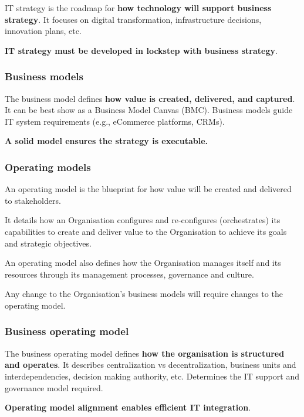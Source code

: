 \indent

IT strategy is the roadmap for \textbf{how technology will support business strategy}. It focuses on digital transformation, infrastructure decisions, innovation plans, etc.

\textbf{IT strategy must be developed in lockstep with business strategy}.

\subsubsection{Business models}

\indent

The business model defines \textbf{how value is created, delivered, and captured}. It can be best show as a Business Model Canvas (BMC). Business models guide IT system requirements (e.g., eCommerce platforms, CRMs).

\textbf{A solid model ensures the strategy is executable.}

\subsubsection{Operating models}

\indent

An operating model is the blueprint for how value will be created and delivered to stakeholders.

It details how an Organisation configures and re-configures (orchestrates) its capabilities to create and deliver value to the Organisation to achieve its goals and strategic objectives.

An operating model also defines how the Organisation manages itself and its resources through its management processes, governance and culture.

Any change to the Organisation’s business models will require changes to the operating model.

\subsubsection{Business operating model}

\indent

The business operating model defines \textbf{how the organisation is structured and operates}. It describes centralization vs decentralization, business units and 
interdependencies, decision making authority, etc. Determines the IT support and governance model required.

\textbf{Operating model alignment enables efficient IT integration}.

